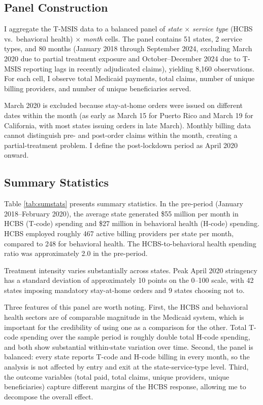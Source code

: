 \documentclass[12pt]{article}
\begin{document}
\subsection{Panel Construction}

I aggregate the T-MSIS data to a balanced panel of \textit{state} $\times$ \textit{service type} (HCBS vs.\ behavioral health) $\times$ \textit{month} cells. The panel contains 51 states, 2 service types, and 80 months (January 2018 through September 2024, excluding March 2020 due to partial treatment exposure and October--December 2024 due to T-MSIS reporting lags in recently adjudicated claims), yielding 8,160 observations. For each cell, I observe total Medicaid payments, total claims, number of unique billing providers, and number of unique beneficiaries served.

March 2020 is excluded because stay-at-home orders were issued on different dates within the month (as early as March 15 for Puerto Rico and March 19 for California, with most states issuing orders in late March). Monthly billing data cannot distinguish pre- and post-order claims within the month, creating a partial-treatment problem. I define the post-lockdown period as April 2020 onward.

\subsection{Summary Statistics}



Table \ref{tab:sumstats} presents summary statistics. In the pre-period (January 2018--February 2020), the average state generated \$55 million per month in HCBS (T-code) spending and \$27 million in behavioral health (H-code) spending. HCBS employed roughly 467 active billing providers per state per month, compared to 248 for behavioral health. The HCBS-to-behavioral health spending ratio was approximately 2.0 in the pre-period.

Treatment intensity varies substantially across states. Peak April 2020 stringency has a standard deviation of approximately 10 points on the 0--100 scale, with 42 states imposing mandatory stay-at-home orders and 9 states choosing not to.

Three features of this panel are worth noting. First, the HCBS and behavioral health sectors are of comparable magnitude in the Medicaid system, which is important for the credibility of using one as a comparison for the other. Total T-code spending over the sample period is roughly double total H-code spending, and both show substantial within-state variation over time. Second, the panel is balanced: every state reports T-code and H-code billing in every month, so the analysis is not affected by entry and exit at the state-service-type level. Third, the outcome variables (total paid, total claims, unique providers, unique beneficiaries) capture different margins of the HCBS response, allowing me to decompose the overall effect.
\end{document}
